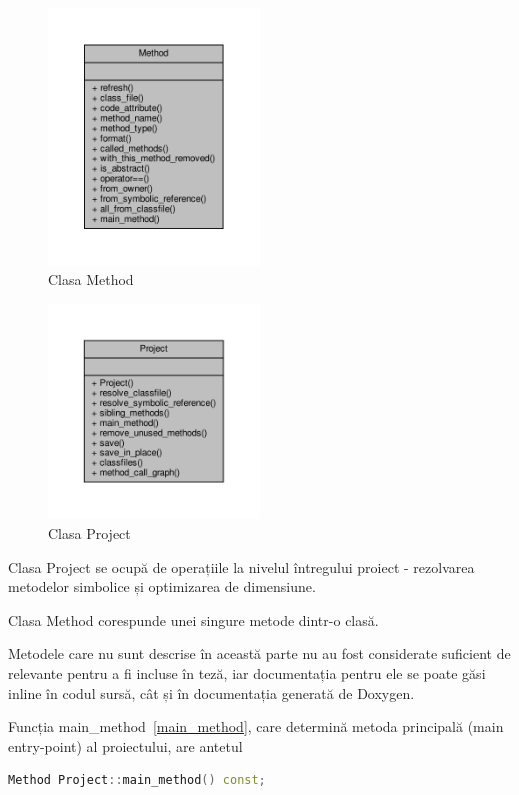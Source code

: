 \begin{figure}[H]
	\centering
	\includegraphics[width=0.5\textwidth]{classMethod__coll__graph}
	\caption{Clasa Method}
    \label{fig:classmethod}
\end{figure}

\begin{figure}[H]
	\centering
	\includegraphics[width=0.5\textwidth]{classProject__coll__graph}
	\caption{Clasa Project}
    \label{fig:classproject}
\end{figure}


Clasa Project se ocupă de operațiile la nivelul întregului proiect - rezolvarea
metodelor simbolice și optimizarea de dimensiune.

Clasa Method corespunde unei singure metode dintr-o clasă.

Metodele care nu sunt descrise în această parte nu au fost considerate suficient
de relevante pentru a fi incluse în teză, iar documentația pentru ele se poate
găsi inline în codul sursă, cât și în documentația generată de Doxygen.

Funcția main\_method~\ref{main_method}, care determină metoda
principală (main entry-point) al proiectului, are antetul
\begin{lstlisting}[language=C++]
Method Project::main_method() const;
\end{lstlisting}

